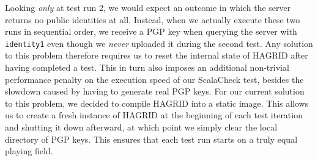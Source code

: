Looking \emph{only} at test run 2, we would expect an outcome in which the server returns no public identities at all. Instead, when we actually execute these two runs in sequential order, we receive a PGP key when querying the server with \texttt{identity1} even though we \emph{never} uploaded it during the second test. 
Any solution to this problem therefore requires us to reset the internal state of HAGRID after having completed a test.
This in turn also imposes an additional non-trivial performance penalty on the execution speed of our ScalaCheck test, besides the slowdown caused by having to generate real PGP keys. 
For our current solution to this problem, we decided to compile HAGRID into a static image. This allows us to create a fresh instance of HAGRID at the beginning of each test iteration and shutting it down afterward, at which point we simply clear the local directory of PGP keys. This ensures that each test run starts on a truly equal playing field.


